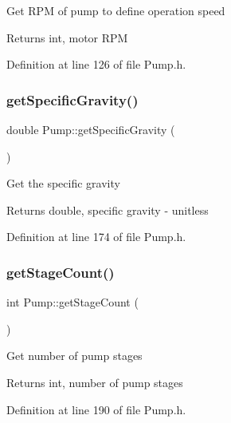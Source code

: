 Get R\+PM of pump to define operation speed \begin{DoxyReturn}{Returns}
int, motor R\+PM 
\end{DoxyReturn}


Definition at line 126 of file Pump.\+h.

\mbox{\label{class_pump_ad3526b01094bfdb382305ca5b6731d53}} 
\subsubsection{\texorpdfstring{get\+Specific\+Gravity()}{getSpecificGravity()}}
{\footnotesize\ttfamily double Pump\+::get\+Specific\+Gravity (\begin{DoxyParamCaption}{ }\end{DoxyParamCaption})\hspace{0.3cm}{\ttfamily [inline]}}

Get the specific gravity \begin{DoxyReturn}{Returns}
double, specific gravity -\/ unitless 
\end{DoxyReturn}


Definition at line 174 of file Pump.\+h.

\mbox{\label{class_pump_a2a8754f53b289dc41f3220adc4eb56e1}} 
\subsubsection{\texorpdfstring{get\+Stage\+Count()}{getStageCount()}}
{\footnotesize\ttfamily int Pump\+::get\+Stage\+Count (\begin{DoxyParamCaption}{ }\end{DoxyParamCaption})\hspace{0.3cm}{\ttfamily [inline]}}

Get number of pump stages \begin{DoxyReturn}{Returns}
int, number of pump stages 
\end{DoxyReturn}


Definition at line 190 of file Pump.\+h.

\mbox{\label{class_pump_ab75d877769b5232c5ab7b4d92940579a}} 
